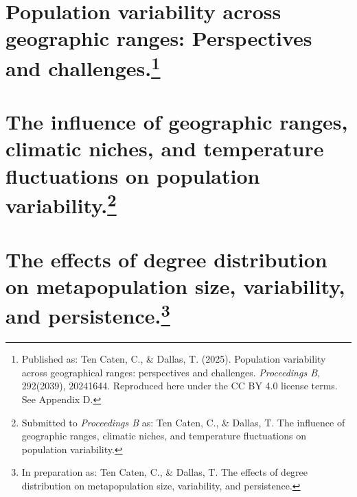 \documentclass{uscthesis}
\begin{document}
\chapter[Population variability across geographic ranges: Perspectives and challenges.]{Population variability across geographic ranges: Perspectives and challenges.\footnote[3]{Published as: Ten Caten, C., \& Dallas, T. (2025). Population variability across geographical ranges: perspectives and challenges. \textit{Proceedings B}, 292(2039), 20241644. Reproduced here under the CC BY 4.0 license terms. See Appendix D.}}    %




\chapter[The influence of geographic ranges, climatic niches, and temperature fluctuations on population variability.]{The influence of geographic ranges, climatic niches, and temperature fluctuations on population variability.\footnote[3]{Submitted to \textit{Proceedings B} as: Ten Caten, C., \& Dallas, T. The influence of geographic ranges, climatic niches, and temperature fluctuations on population variability.}}   

\setcounter{page}{76} %
                         
\chapter[The effects of degree distribution on metapopulation size, variability, and persistence]{The effects of degree distribution on metapopulation size, variability, and persistence.\footnote[4]{In preparation as: Ten Caten, C., \& Dallas, T. The effects of degree distribution on metapopulation size, variability, and persistence.}}    %

            
        
%

%
\end{document}
